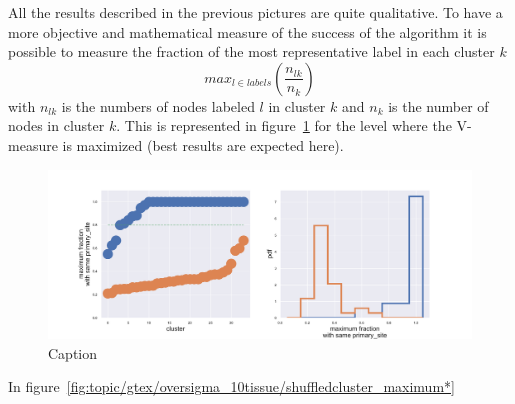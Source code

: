 All the results described in the previous pictures are quite qualitative. To have a more objective and mathematical measure of the success of the algorithm it is possible to measure the fraction of the most representative label in each cluster $k$
\[
max_{l\in labels}\left(\frac{n_{l k}}{n_k}\right)
\]
with $n_{l k}$ is the numbers of nodes labeled $l$ in cluster $k$ and $n_k$ is the number of nodes in cluster $k$. This is represented in figure~\ref{fig:gtex/oversigma_10tissue/shuffledcluster_maximum_l2_primary_site} for the level where the V-measure is maximized (best results are expected here).
\begin{figure}[htb!]
    \centering
    \includegraphics[width=0.9\linewidth]{pictures/topic/gtex/oversigma_10tissue/shuffledcluster_maximum_l2_primary_site.pdf}
    \caption{Caption}
    \label{fig:gtex/oversigma_10tissue/shuffledcluster_maximum_l2_primary_site}
\end{figure}
In figure~\ref{fig:topic/gtex/oversigma_10tissue/shuffledcluster_maximum*}
